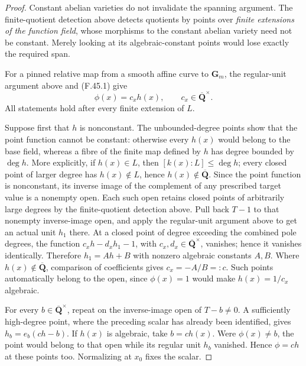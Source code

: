 \begin{proof}
Constant abelian varieties do not invalidate the spanning argument.
The finite-quotient detection above detects quotients by points over
\emph{finite extensions of the function field}, whose morphisms to the constant abelian variety need
not be constant. Merely looking at its algebraic-constant points would
lose exactly the required span.


For a pinned relative map from a smooth affine curve to \(\mathbf G_m\),
the regular-unit argument above and \textup{(F.45.1)} give
\[
                 \phi(x)=c_xh(x),
          \qquad c_x\in\overline{\mathbf Q}^{\times}.      \tag{F.45.11}
\]
All statements hold after every finite extension of \(L\).

Suppose first that \(h\) is nonconstant. The unbounded-degree points
show that the point function cannot be constant: otherwise every
\(h(x)\) would belong to the base field, whereas a fibre of the finite
map defined by \(h\) has degree bounded by \(\deg h\). More explicitly,
if \(h(x)\in L\), then \([k(x):L]\le\deg h\); every closed point
of larger degree has \(h(x)\notin L\), hence
\(h(x)\notin\overline{\mathbf Q}\). Since the point function is
nonconstant, its inverse image of the complement of any prescribed
target value is a nonempty open. Each such open retains closed points
of arbitrarily large degrees by the finite-quotient detection above. Pull back
\(T-1\) to that nonempty inverse-image open, and apply the regular-unit argument above to get
an actual unit \(h_1\) there. At a closed point of degree exceeding the
combined pole degrees, the function
\(c_xh-d_xh_1-1\), with \(c_x,d_x\in\overline{\mathbf Q}^\times\),
vanishes; hence it vanishes identically. Therefore
\(h_1=Ah+B\) with nonzero algebraic constants \(A,B\). Where
\(h(x)\notin\overline{\mathbf Q}\), comparison of coefficients gives
\(c_x=-A/B=:c\). Such points automatically belong to the open, since
\(\phi(x)=1\) would make \(h(x)=1/c_x\) algebraic.

For every \(b\in\overline{\mathbf Q}^\times\), repeat on the
inverse-image open of \(T-b\ne0\). A sufficiently high-degree point,
where the preceding scalar has already been identified, gives
\(h_b=e_b(ch-b)\). If \(h(x)\) is algebraic, take
\(b=ch(x)\). Were \(\phi(x)\ne b\), the point would belong to that
open while its regular unit \(h_b\) vanished. Hence \(\phi=ch\) at
these points too. Normalizing at \(x_0\) fixes the scalar.


\end{proof}
